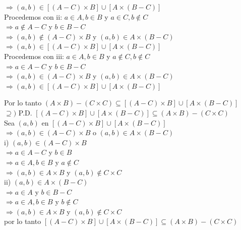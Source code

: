 \documentclass[12pt]{article}
\begin{document}
\begin{enumerate}[label=\alph*)]
    $\Longrightarrow (a, b) \in [(A - C) \times B] \cup [A \times (B - C)]$\\

    Procedemos con ii: $a \in A, b \in B$ y $a \in C, b \notin C$\\

    $\Longrightarrow a \notin A - C$ y $b \in B - C$\\

    $\Longrightarrow (a, b) \notin (A - C) \times B$ y $(a, b) \in A \times (B - C)$\\

    $\Longrightarrow (a, b) \in [(A - C) \times B] \cup [A \times (B - C)]$\\

    Procedemos con iii: $a \in A, b \in B$ y $a \notin C, b \notin C$\\

    $\Longrightarrow a \in A - C$ y $b \in B - C$\\

    $\Longrightarrow (a, b) \in (A - C) \times B$ y $(a, b) \in A \times (B - C)$\\

    $\Longrightarrow (a, b) \in [(A - C) \times B] \cup [A \times (B - C)]$

    Por lo tanto  $(A \times B) - (C \times C) \subseteq [(A - C) \times B] \cup [A \times (B - C)]$\\

    $\supseteq)$ P.D. $[(A - C) \times B] \cup [A \times (B - C)] \subseteq (A \times B) - (C \times C)$\\

    Sea $(a, b)$ en $[(A - C) \times B] \cup [A \times (B - C)]$\\

    $\Longrightarrow (a, b) \in (A - C) \times B$ o $(a, b) \in A \times (B - C)$\\

    i) $(a, b) \in (A - C) \times B$\\

    $\Longrightarrow a \in A - C$ y $b \in B$\\

    $\Longrightarrow a \in A, b \in B$ y $a \notin C$\\

    $\Longrightarrow (a, b) \in A \times B$ y $(a, b) \notin C \times C$\\

    ii) $(a, b) \in A \times (B - C)$\\

    $\Longrightarrow a \in A$ y $b \in B - C$\\

    $\Longrightarrow a \in A, b \in B$ y $b \notin C$\\

    $\Longrightarrow (a, b) \in A \times B$ y $(a, b) \notin C \times C$\\

    por lo tanto $[(A - C) \times B] \cup [A \times (B - C)] \subseteq (A \times B) - (C \times C)$
\end{enumerate}
\end{document}
